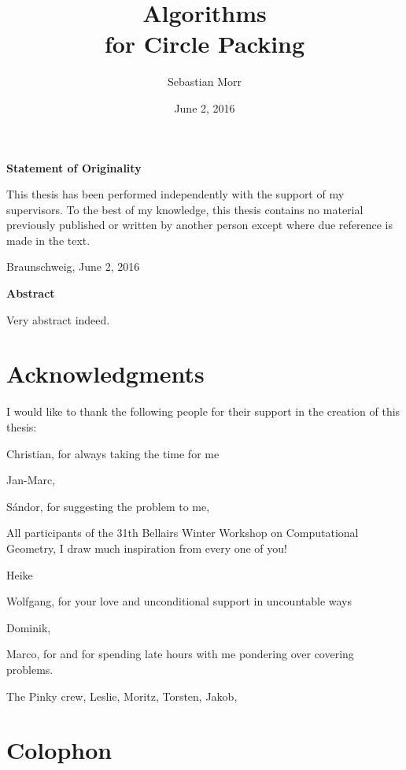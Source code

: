 \documentclass[a4paper,style=print,bibliography=totoc,nexus,lnum,extramargin]{tubsbook}
\title{Algorithms \\for Circle Packing}
\author{\sffamily\LARGE Sebastian Morr}
\date{\large June 2, 2016}
\begin{document}
\frontmatter %

\maketitle
\cleardoublepage

\thispagestyle{plain} %
\vspace*{7cm}
\centerline{\bfseries Statement of Originality}
\vspace*{1em}
\noindent
This thesis has been performed independently with the support of my supervisors.
To the best of my knowledge, this thesis contains no material previously
published or written by another person except where due reference is made in the text.

\par
  \bigskip\noindent Braunschweig, June 2, 2016 \par
  \vspace*{10mm}
  \hfill\hrulefill
\cleardoublepage

\thispagestyle{plain} %
\centerline{\bfseries Abstract}
\vspace*{1em}
\noindent
Very abstract indeed.
\cleardoublepage

\section*{Acknowledgments}

I would like to thank the following people for their support in the creation of this thesis:

Christian, for always taking the time for me

Jan-Marc, 

Sándor, for suggesting the problem to me, 

All participants of the 31th Bellairs Winter Workshop on Computational Geometry, I draw much inspiration from every one of you!

Heike

Wolfgang, for your love and unconditional support in uncountable ways

Dominik, 

Marco, for and for spending late hours with me pondering over covering problems.

The Pinky crew, Leslie, Moritz, Torsten, Jakob,

\section*{Colophon}
\end{document}
